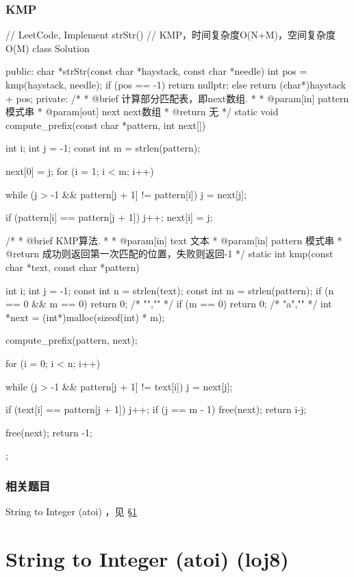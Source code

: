 \subsubsection{KMP}
\begin{Code}
// LeetCode, Implement strStr()
// KMP，时间复杂度O(N+M)，空间复杂度O(M)
class Solution {
public:
    char *strStr(const char *haystack, const char *needle) {
        int pos = kmp(haystack, needle);
        if (pos == -1) return nullptr;
        else return (char*)haystack + pos;
    }
private:
    /*
     * @brief 计算部分匹配表，即next数组.
     *
     * @param[in] pattern 模式串
     * @param[out] next next数组
     * @return 无
     */
    static void compute_prefix(const char *pattern, int next[]) {
        int i;
        int j = -1;
        const int m = strlen(pattern);

        next[0] = j;
        for (i = 1; i < m; i++) {
            while (j > -1 && pattern[j + 1] != pattern[i]) j = next[j];

            if (pattern[i] == pattern[j + 1]) j++;
            next[i] = j;
        }
    }

    /*
     * @brief KMP算法.
     *
     * @param[in] text 文本
     * @param[in] pattern 模式串
     * @return 成功则返回第一次匹配的位置，失败则返回-1
     */
    static int kmp(const char *text, const char *pattern) {
        int i;
        int j = -1;
        const int n = strlen(text);
        const int m = strlen(pattern);
        if (n == 0 && m == 0) return 0; /* "","" */
        if (m == 0) return 0;  /* "a","" */
        int *next = (int*)malloc(sizeof(int) * m);

        compute_prefix(pattern, next);

        for (i = 0; i < n; i++) {
            while (j > -1 && pattern[j + 1] != text[i]) j = next[j];

            if (text[i] == pattern[j + 1]) j++;
            if (j == m - 1) {
                free(next);
                return i-j;
            }
        }

        free(next);
        return -1;
    }
};
\end{Code}


\subsubsection{相关题目}
\begindot
\item String to Integer (atoi) ，见 \S \ref{sec:string-to-integer}
\myenddot


\section{String to Integer (atoi) (loj8)} %
\label{sec:string-to-integer}


